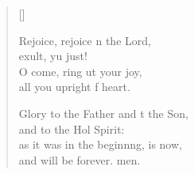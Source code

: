 \begin{verse}[\versewidth]
\begin{patverse}
Rejoice, rejoice \pointup{\i}n the Lord,\Med\\
exult, yu just!\\
O come, ring ut your joy,\Med\\
all you upright f heart.

Glory to the Father and t the Son,\Med\\
and to the Hol Spirit:\\
as it was in the beginn\pointup{\i}ng, is now,\Med\\
and will be forever. men. 
  \end{patverse}
\end{verse}
